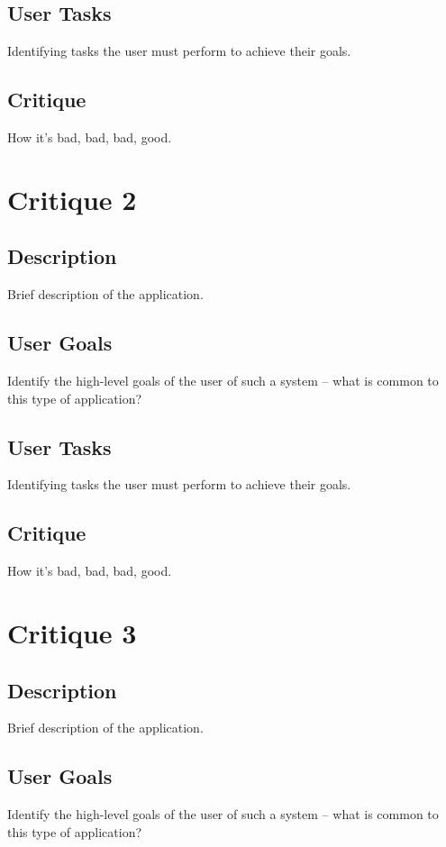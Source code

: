 \documentclass{sigchi}
\begin{document}
\subsection{User Tasks}
Identifying tasks the user must perform to achieve their goals.

\subsection{Critique}
How it's bad, bad, bad, good.



\section{Critique 2}
\subsection{Description}
Brief description of the application.

\subsection{User Goals}
Identify the high-level goals of the user of such a system – what is common to this type of
application?

\subsection{User Tasks}
Identifying tasks the user must perform to achieve their goals.

\subsection{Critique}
How it's bad, bad, bad, good.



\section{Critique 3}
\subsection{Description}
Brief description of the application.

\subsection{User Goals}
Identify the high-level goals of the user of such a system – what is common to this type of
application?
\end{document}
